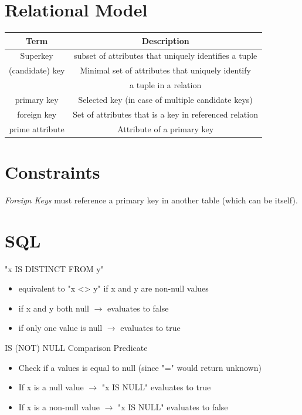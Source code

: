 \documentclass{article}
\begin{document}
\begin{multicols*}{2}
    \section*{Relational Model}
    \begin{tabular}{|| c c ||}
        \hline
        Term            & Description                                            \\
        \hline\hline
        Superkey        & subset of attributes that uniquely identifies a tuple  \\
        (candidate) key & Minimal set of attributes that uniquely identify       \\
                        & a tuple in a relation                                  \\
        primary key     & Selected key (in case of multiple candidate keys)      \\
        foreign key     & Set of attributes that is a key in referenced relation \\
        prime attribute & Attribute of a primary key                             \\
        \hline
    \end{tabular}
    \section*{Constraints}
    \emph{Foreign Keys} must reference a primary key in another table (which can be itself).
    \section*{SQL}
    "x IS DISTINCT FROM y"
    \begin{itemize}
        \item equivalent to "x <> y" if x and y are non-null values
        \item if x and y both null $\rightarrow$ evaluates to false
        \item if only one value is null $\rightarrow$ evaluates to true
    \end{itemize}
    IS (NOT) NULL Comparison Predicate
    \begin{itemize}
        \item Check if a values is equal to null (since "=" would return unknown)
        \item If x is a null value $\rightarrow$ "x IS NULL" evaluates to true
        \item If x is a non-null value $\rightarrow$ "x IS NULL" evaluates to false    \end{itemize}

\end{multicols*}
\end{document}
